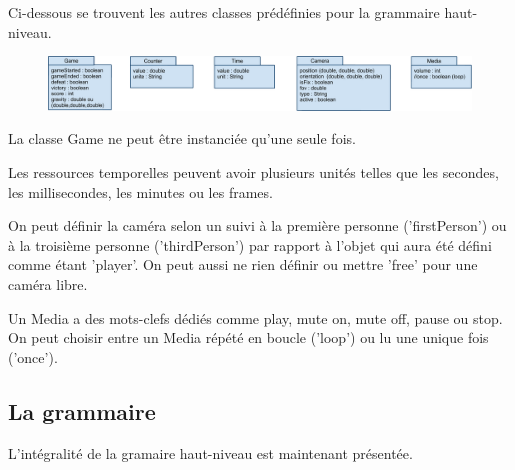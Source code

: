 Ci-dessous se trouvent les autres classes prédéfinies pour la grammaire haut-niveau.

\begin{figure}[h]
 \centering
 \includegraphics[width=\textwidth]{img/otherclass}
\end{figure}

La classe Game ne peut être instanciée qu'une seule fois.

Les ressources temporelles peuvent avoir plusieurs unités telles que les secondes, les millisecondes, les minutes ou les frames.

On peut définir la caméra selon un suivi à la première personne ('firstPerson') ou à la troisième personne ('thirdPerson') par rapport 
à l'objet qui aura été défini comme étant 'player'.
On peut aussi ne rien définir ou mettre 'free' pour une caméra libre.

Un Media a des mots-clefs dédiés comme play, mute on, mute off, pause ou stop.
On peut choisir entre un Media répété en boucle ('loop') ou lu une unique fois ('once').

\subsection{La grammaire}

L'intégralité de la gramaire haut-niveau est maintenant présentée.

